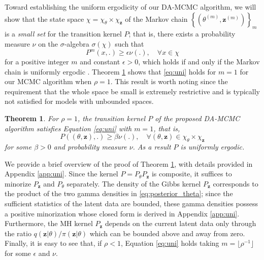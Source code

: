 \documentclass[12pt]{article}
\newtheorem{theorem}{Theorem}[section]
\begin{document}
	Toward establishing the uniform ergodicity of our DA-MCMC algorithm, we will show that the state space $\chi = \chi_{\theta}\times\chi_{\mathbf{z}}$ of the Markov chain $\left\{\left(\theta^{(m)}, \mathbf{z}^{(m)}\right)\right\}_m$ is a \textit{small set} for the transition kernel $P$; that is, there exists a probability measure $\nu$ on the $\sigma$-algebra $\sigma(\chi)$ such that
	\begin{equation}
		\label{eq:uni}
		P^m(x,.) \ge \epsilon \nu(.), \quad \forall x\in \chi
	\end{equation}
	for a positive integer $m$ and constant $\epsilon > 0$, which holds if and only if the Markov chain is uniformly ergodic \cite{Tierney.1994}.
	Theorem \ref{pro:uni} shows that \eqref{eq:uni} holds for $m=1$ for our MCMC algorithm when $\rho=1$. This result is worth noting since the requirement that the whole space be small is extremely restrictive and is typically not satisfied for models with unbounded spaces.
	
	\begin{theorem}
		\label{pro:uni}
		For $\rho = 1$, the transition kernel $P$ of the proposed DA-MCMC algorithm satisfies Equation \eqref{eq:uni} with $m=1$, that is,
		$$P((\theta, \mathbf{z}), .) \ge \beta \nu(.) , \quad \forall (\theta, \mathbf{z}) \in \chi_\theta \times \chi_\mathbf{z}
		$$
		for some $\beta>0$ and probability measure $\nu$. As a result $P$ is uniformly ergodic.
	\end{theorem}
	
	We provide a brief overview of the proof of Theorem \ref{pro:uni}, with details provided in Appendix \ref{app:uni}. Since the kernel $P = P_{\theta} P_{\mathbf{z}}$ is composite, it suffices to minorize $P_\mathbf{z}$ and $P_\theta$ separately. The density of the Gibbs kernel $P_\mathbf{z}$ corresponds to the product of the two gamma densities in \eqref{eq:posterior_theta}; since the sufficient statistics of the latent data are bounded, these gamma densities possess a positive minorization whose closed form is derived in Appendix \ref{app:uni}. Furthermore, the MH kernel $P_\mathbf{z}$ depends on the current latent data only through the ratio $q(\mathbf{z}|\theta)/\pi(\mathbf{z}|\theta)$ which can be bounded above and away from zero.
	Finally, it is easy to see that, if $\rho < 1$, Equation \eqref{eq:uni} holds taking 
	$m=\lfloor \rho^{-1} \rfloor$ for some $\epsilon$ and $\nu$.
	
	
\end{document}
